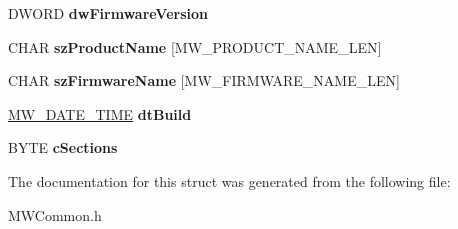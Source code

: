 \begin{DoxyCompactItemize}
\item 
\hypertarget{struct__MW__FIRMWARE__INFO__HEADER_a31de0d8c6fc7a9bd87b6cf5a58bbea9d}{D\-W\-O\-R\-D {\bfseries dw\-Firmware\-Version}}\label{struct__MW__FIRMWARE__INFO__HEADER_a31de0d8c6fc7a9bd87b6cf5a58bbea9d}

\item 
\hypertarget{struct__MW__FIRMWARE__INFO__HEADER_af7f0cc64b3801d136d225fe2821578e2}{C\-H\-A\-R {\bfseries sz\-Product\-Name} \mbox{[}M\-W\-\_\-\-P\-R\-O\-D\-U\-C\-T\-\_\-\-N\-A\-M\-E\-\_\-\-L\-E\-N\mbox{]}}\label{struct__MW__FIRMWARE__INFO__HEADER_af7f0cc64b3801d136d225fe2821578e2}

\item 
\hypertarget{struct__MW__FIRMWARE__INFO__HEADER_a7351e3eef5ca8f44f7911e4db3cdd1b4}{C\-H\-A\-R {\bfseries sz\-Firmware\-Name} \mbox{[}M\-W\-\_\-\-F\-I\-R\-M\-W\-A\-R\-E\-\_\-\-N\-A\-M\-E\-\_\-\-L\-E\-N\mbox{]}}\label{struct__MW__FIRMWARE__INFO__HEADER_a7351e3eef5ca8f44f7911e4db3cdd1b4}

\item 
\hypertarget{struct__MW__FIRMWARE__INFO__HEADER_a541066e99dbb99e728fb0332a096a314}{\hyperlink{struct__MW__DATE__TIME}{M\-W\-\_\-\-D\-A\-T\-E\-\_\-\-T\-I\-M\-E} {\bfseries dt\-Build}}\label{struct__MW__FIRMWARE__INFO__HEADER_a541066e99dbb99e728fb0332a096a314}

\item 
\hypertarget{struct__MW__FIRMWARE__INFO__HEADER_a52075b6dda9792d82462a6fac128377d}{B\-Y\-T\-E {\bfseries c\-Sections}}\label{struct__MW__FIRMWARE__INFO__HEADER_a52075b6dda9792d82462a6fac128377d}

\end{DoxyCompactItemize}


The documentation for this struct was generated from the following file\-:\begin{DoxyCompactItemize}
\item 
M\-W\-Common.\-h\end{DoxyCompactItemize}
